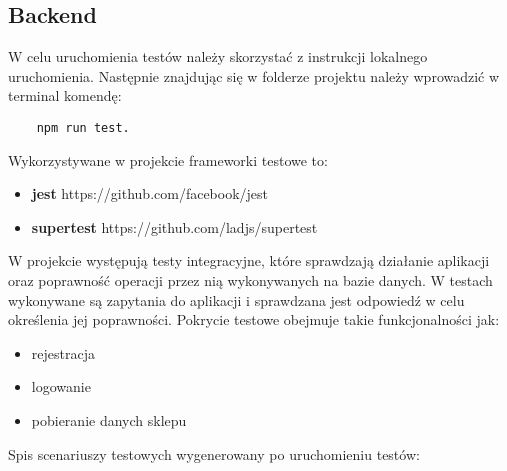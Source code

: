 \documentclass{article}
\begin{document}
        \subsection{Backend}
        W celu uruchomienia testów należy skorzystać z instrukcji lokalnego uruchomienia. Następnie znajdując się w folderze projektu należy wprowadzić w terminal komendę: 
        \begin{lstlisting}
    npm run test.
        \end{lstlisting}
        Wykorzystywane w projekcie frameworki testowe to:
        \begin{itemize}
            \item \textbf{jest} https://github.com/facebook/jest
            \item \textbf{supertest} https://github.com/ladjs/supertest
        \end{itemize}
        W projekcie występują testy integracyjne, które sprawdzają działanie aplikacji oraz poprawność operacji przez nią wykonywanych na bazie danych. W testach wykonywane są zapytania do aplikacji i sprawdzana jest odpowiedź w celu określenia jej poprawności. Pokrycie testowe obejmuje takie funkcjonalności jak: 
        \begin{itemize}
            \item rejestracja
            \item logowanie
            \item pobieranie danych sklepu
        \end{itemize}
        Spis scenariuszy testowych wygenerowany po uruchomieniu testów:
\end{document}
